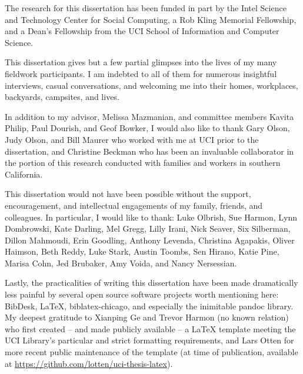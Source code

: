 \acknowledgments
{
The research for this dissertation has been funded in part by the Intel Science and Technology Center for Social Computing, a Rob Kling Memorial Fellowship, and a Dean's Fellowship from the UCI School of Information and Computer Science. 
	
This dissertation gives but a few partial glimpses into the lives of my many fieldwork participants. I am indebted to all of them for numerous insightful interviews, casual conversations, and welcoming me into their homes, workplaces, backyards, campsites, and lives.
  
In addition to my advisor, Melissa Mazmanian, and committee members Kavita Philip, Paul Dourish, and Geof Bowker, I would also like to thank Gary Olson, Judy Olson, and Bill Maurer who worked with me at UCI prior to the dissertation, and Christine Beckman who has been an invaluable collaborator in the portion of this research conducted with families and workers in southern California.

This dissertation would not have been possible without the support, encouragement, and intellectual engagements of my family, friends, and colleagues. In particular, I would like to thank: Luke Olbrish, Sue Harmon, Lynn Dombrowski, Kate Darling, Mel Gregg, Lilly Irani, Nick Seaver, Six Silberman, Dillon Mahmoudi, Erin Goodling, Anthony Levenda, Christina Agapakis, Oliver Haimson, Beth Reddy, Luke Stark, Austin Toombs, Sen Hirano, Katie Pine, Marisa Cohn, Jed Brubaker, Amy Voida, and Nancy Nersessian. 

Lastly, the practicalities of writing this dissertation have been made dramatically less painful by several open source software projects worth mentioning here: BibDesk, LaTeX, biblatex-chicago, and especially the inimitable pandoc library. My deepest gratitude to Xianping Ge and Trevor Harmon (no known relation) who first created -- and made publicly available -- a LaTeX template meeting the UCI Library's particular and strict formatting requirements, and Lars Otten for more recent public maintenance of the template (at time of publication, available at \url{https://github.com/lotten/uci-thesis-latex}).
}


\newcommand{\mypubentry}[4]{
    \textbf{#1} \hfill \textbf{#2} \\ 
    #3 \\
		#4
}

